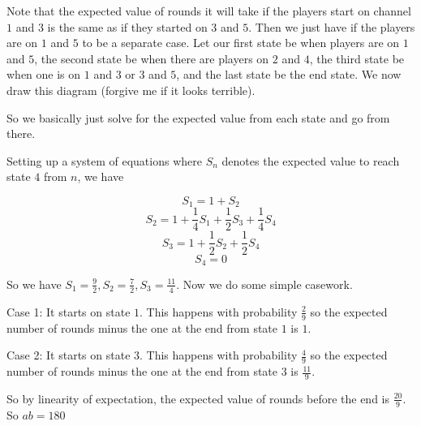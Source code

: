 \begin{solution}\hfil\medskip

    Note that the expected value of rounds it will take if the players start on channel $1$ and $3$ is the same as if they started on $3$ and $5$. Then we just have if the players are on $1$ and $5$ to be a separate case. Let our first state be when players are on $1$ and $5$, the second state be when there are players on $2$ and $4$, the third state be when one is on $1$ and $3$ or $3$ and $5$, and the last state be the end state. We now draw this diagram (forgive me if it looks terrible).

    \begin{figure}[h!]
        \centering
    \end{figure}
    
    So we basically just solve for the expected value from each state and go from there. 
    
    
    Setting up a system of equations where $S_n$ denotes the expected value to reach state $4$ from $n$, we have
    
    $$S_1 = 1 + S_2$$
    $$S_2 = 1+\frac{1}{4}S_1 + \frac{1}{2}S_3 + \frac{1}{4} S_4$$
    $$S_3 = 1+\frac{1}{2}S_2 + \frac{1}{2}S_4$$
    $$S_4 = 0$$
    
    So we have $S_1 = \frac{9}{2}, S_2 = \frac{7}{2}, S_3 = \frac{11}{4}$. 
    Now we do some simple casework.
    
    Case 1: It starts on state $1$.
    This happens with probability $\frac{2}{9}$ so the expected number of rounds minus the one at the end from state $1$ is $1$.
    
    Case 2: It starts on state $3$. 
    This happens with probability $\frac{4}{9}$ so the expected number of rounds minus the one at the end from state $3$ is $\frac{11}{9}$.
    
    So by linearity of expectation, the expected value of rounds before the end is $\frac{20}{9}$. So $ab=\boxed{180}$

\end{solution}\bigskip
